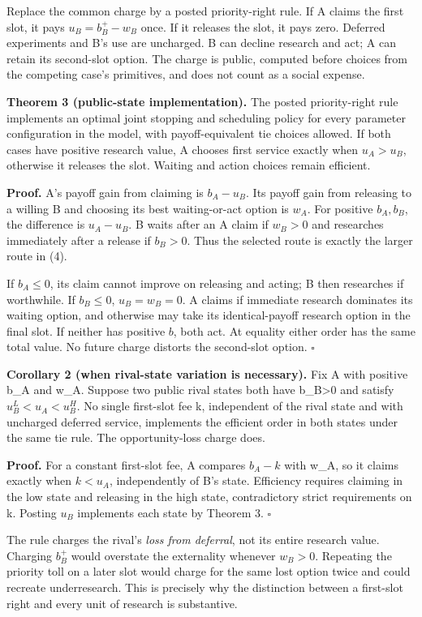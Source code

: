 \documentclass[
  11pt,
]{article}
\begin{document}
Replace the common charge by a posted priority-right rule. If A claims
the first slot, it pays \(u_B=b_B^+-w_B\) once. If it releases the slot,
it pays zero. Deferred experiments and B's use are uncharged. B can
decline research and act; A can retain its second-slot option. The
charge is public, computed before choices from the competing case's
primitives, and does not count as a social expense.

\textbf{Theorem 3 (public-state implementation).} The posted
priority-right rule implements an optimal joint stopping and scheduling
policy for every parameter configuration in the model, with
payoff-equivalent tie choices allowed. If both cases have positive
research value, A chooses first service exactly when \(u_A>u_B\),
otherwise it releases the slot. Waiting and action choices remain
efficient.

\textbf{Proof.} A's payoff gain from claiming is \(b_A-u_B\). Its payoff
gain from releasing to a willing B and choosing its best waiting-or-act
option is \(w_A\). For positive \(b_A,b_B\), the difference is
\(u_A-u_B\). B waits after an A claim if \(w_B>0\) and researches
immediately after a release if \(b_B>0\). Thus the selected route is
exactly the larger route in (4).

If \(b_A\leq0\), its claim cannot improve on releasing and acting; B
then researches if worthwhile. If \(b_B\leq0\), \(u_B=w_B=0\). A claims
if immediate research dominates its waiting option, and otherwise may
take its identical-payoff research option in the final slot. If neither
has positive \(b\), both act. At equality either order has the same
total value. No future charge distorts the second-slot option.
\(\square\)

\textbf{Corollary 2 (when rival-state variation is necessary).} Fix A
with positive b\_A and w\_A. Suppose two public rival states both have
b\_B\textgreater0 and satisfy \(u_B^{L}<u_A<u_B^{H}\). No single
first-slot fee k, independent of the rival state and with uncharged
deferred service, implements the efficient order in both states under
the same tie rule. The opportunity-loss charge does.

\textbf{Proof.} For a constant first-slot fee, A compares \(b_A-k\) with
w\_A, so it claims exactly when \(k<u_A\), independently of B's state.
Efficiency requires claiming in the low state and releasing in the high
state, contradictory strict requirements on k. Posting \(u_B\)
implements each state by Theorem 3. \(\square\)

The rule charges the rival's \emph{loss from deferral}, not its entire
research value. Charging \(b_B^+\) would overstate the externality
whenever \(w_B>0\). Repeating the priority toll on a later slot would
charge for the same lost option twice and could recreate underresearch.
This is precisely why the distinction between a first-slot right and
every unit of research is substantive.
\end{document}
